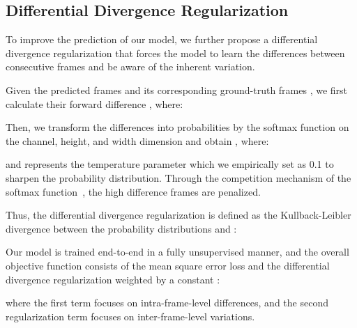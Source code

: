\documentclass[10pt,twocolumn,letterpaper]{article}
\begin{document}
\subsection{Differential Divergence Regularization}

To improve the prediction of our model, we further propose a differential divergence regularization that forces the model to learn the differences between consecutive frames and be aware of the inherent variation. 

Given the predicted frames  and its corresponding ground-truth frames , we first calculate their forward difference , where:


Then, we transform the differences into probabilities by the softmax function on the channel, height, and width dimension and obtain , where:

and  represents the temperature parameter which we empirically set as 0.1 to sharpen the probability distribution. Through the competition mechanism of the softmax function~\cite{choromanski2020rethinking,peng2020random,pmlr-v162-wu22m}, the high difference frames are penalized.

Thus, the differential divergence regularization  is defined as the Kullback-Leibler divergence between the probability distributions  and :


Our model is trained end-to-end in a fully unsupervised manner, and the overall objective function consists of the mean square error loss and the differential divergence regularization weighted by a constant :

where the first term focuses on intra-frame-level differences, and the second regularization term focuses on inter-frame-level variations.
\end{document}
